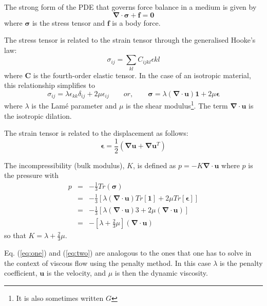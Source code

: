 The strong form of the PDE that governs force balance in a medium is given by
\[
{\bm \nabla}\cdot{\bm \sigma}  + {\bm f} = {\bm 0}
\]
where ${\bm \sigma}$ is the stress tensor and ${\bm f}$ is a body force.

The stress tensor is related to the strain tensor through the generalised 
Hooke's law:
\begin{equation}
\sigma_{ij}=\sum_{kl}C_{ijkl}\epsilon{kl} \label{eq:one}
\end{equation}
where ${\bm C}$ is the fourth-order elastic tensor.
In the case of an isotropic material, this relationship simplifies to
\begin{equation}
\sigma_{ij}=\lambda \epsilon_{kk} \delta_{ij} + 2\mu \epsilon_{ij}
\quad\quad
or, 
\quad\quad
{\bm \sigma} = \lambda ({\bm \nabla}\cdot{\bm u})  {\bm 1} + 2\mu {\bm \epsilon}   \label{eq:two}
\end{equation}
where $\lambda$ is the Lam\'e parameter and $\mu$ is the shear modulus\footnote{It is also sometimes written $G$}.
The term ${\bm \nabla}\cdot{\bm u}$ is the isotropic dilation.

 

The strain tensor is related to the displacement as follows: 
\[
{\bm \epsilon} = \frac{1}{2}({\bm \nabla}{\bm u} + {\bm \nabla}{\bm u}^T)
\]

The incompressibility (bulk modulus), $K$, is defined as $p=-K {\bm \nabla}\cdot{\bm u}$ 
where $p$ is the pressure with 
\begin{eqnarray}
p&=&-\frac{1}{3}Tr({\bm \sigma}) \nonumber\\
 &=& -\frac{1}{3} [ \lambda ({\bm \nabla}\cdot{\bm u}) Tr[{\bm 1}] + 2 \mu Tr[{\bm \epsilon}]] \nonumber\\
 &=& -\frac{1}{3} [ \lambda ({\bm \nabla}\cdot{\bm u})  3  + 2 \mu  ({\bm \nabla}\cdot{\bm u}) ] \nonumber\\
 &=& -[ \lambda  + \frac{2}{3} \mu ]   ({\bm \nabla}\cdot{\bm u})  
\end{eqnarray}
so that $K=\lambda+\frac{2}{3}\mu$.



\begin{remark}
Eq. (\ref{eq:one}) and (\ref{eq:two}) are analogous to the ones that one has to solve
in the context of viscous flow using the penalty method. In this case $\lambda$ is the penalty coefficient, 
${\bm u}$ is the velocity, and $\mu$ is then the dynamic viscosity.
\end{remark}

